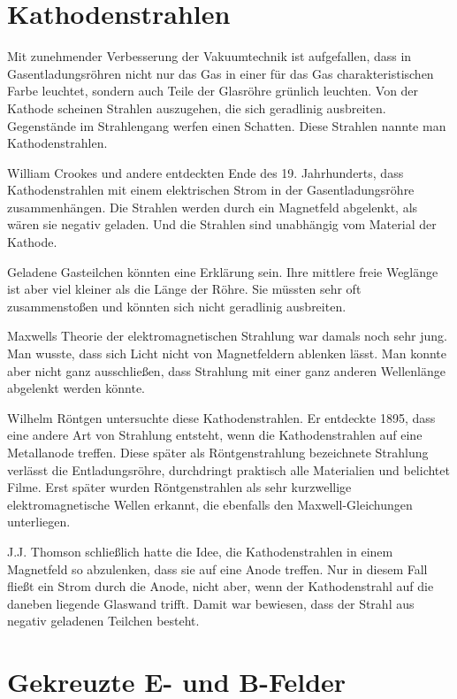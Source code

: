 \section{Kathodenstrahlen}

Mit zunehmender Verbesserung der Vakuumtechnik ist aufgefallen, dass in Gasentladungsröhren nicht nur das Gas in einer für das Gas charakteristischen Farbe leuchtet, sondern auch Teile der Glasröhre grünlich leuchten.  Von der Kathode scheinen Strahlen auszugehen, die sich geradlinig ausbreiten. Gegenstände im Strahlengang werfen einen Schatten. Diese Strahlen nannte man Kathodenstrahlen.

William Crookes und andere entdeckten Ende des 19. Jahrhunderts, dass Kathodenstrahlen mit einem elektrischen Strom in der Gasentladungsröhre zusammenhängen. Die Strahlen werden durch ein Magnetfeld abgelenkt, als wären sie negativ geladen. Und die Strahlen sind unabhängig vom Material der Kathode.

Geladene Gasteilchen könnten eine Erklärung sein. Ihre mittlere freie Weglänge ist aber viel kleiner als die Länge der Röhre. Sie müssten sehr oft zusammenstoßen und könnten sich nicht geradlinig ausbreiten.

Maxwells Theorie der elektromagnetischen Strahlung war damals noch sehr jung. Man wusste, dass sich Licht nicht von Magnetfeldern ablenken lässt. Man konnte aber nicht ganz ausschließen, dass Strahlung mit einer ganz anderen Wellenlänge abgelenkt werden könnte.

Wilhelm Röntgen untersuchte diese Kathodenstrahlen. Er entdeckte 1895, dass eine andere Art von Strahlung entsteht, wenn die Kathodenstrahlen auf eine Metallanode treffen. Diese später als Röntgenstrahlung bezeichnete Strahlung verlässt die Entladungsröhre, durchdringt praktisch alle Materialien und belichtet Filme. Erst später wurden Röntgenstrahlen als sehr kurzwellige elektromagnetische Wellen erkannt, die ebenfalls den Maxwell-Gleichungen unterliegen.

J.J. Thomson schließlich hatte die Idee, die Kathodenstrahlen in einem Magnetfeld so abzulenken, dass sie auf eine Anode treffen. Nur in diesem Fall fließt ein Strom durch die Anode, nicht aber, wenn der Kathodenstrahl auf die daneben liegende Glaswand trifft. Damit war bewiesen, dass der Strahl aus negativ geladenen Teilchen besteht.

\section{Gekreuzte E- und B-Felder}

